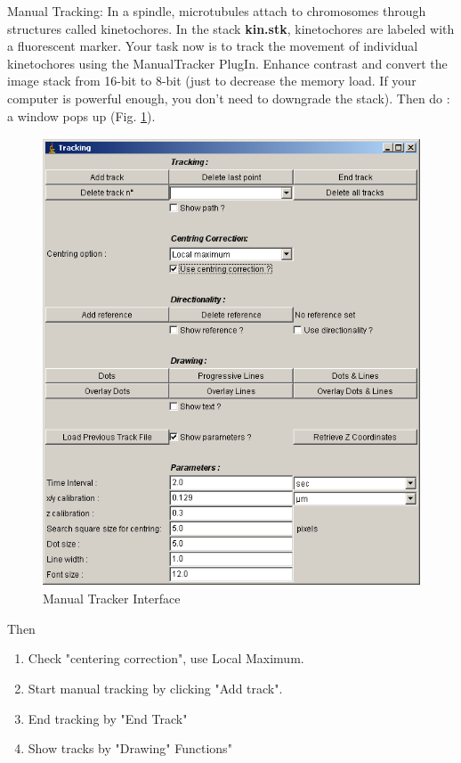 \begin{indentexercise}{1}
\label{exer:manualtracking}
\item Manual Tracking: In a spindle, microtubules attach to chromosomes through structures called kinetochores. In the stack \textbf{kin.stk}, kinetochores are labeled with a fluorescent marker. Your task now is to track the movement of individual kinetochores using the ManualTracker PlugIn. Enhance contrast and convert the image stack from 16-bit to 8-bit (just to decrease the memory load. If your computer is powerful enough, you don't need to downgrade the stack). Then do : a window pops up (Fig. \ref{fig:img135}). 

\begin{figure}[H]
\begin{center}
\includegraphics[width=11.298cm,height=13.323cm]{fig/CMCIBasicCourse201102-img135.png}
\caption{ Manual Tracker Interface}
\label{fig:img135}
\end{center}
\end{figure}

Then 
\begin{enumerate}
\item Check "centering correction", use Local Maximum.
\item Start manual tracking by clicking "Add track".
\item End tracking by "End Track"
\item Show tracks by "Drawing" Functions"
\end{enumerate}


\end{indentexercise}
